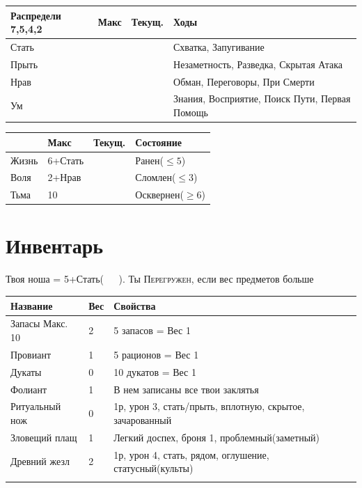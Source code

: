 \documentclass[10pt,twoside]{report}
\begin{document}
\begin{center}
\begin{tabular}{|p{2cm}|p{1cm}|p{1cm}|p{3cm}|}
\hline
  Распредели 7,5,4,2 & Макс & Текущ. & Ходы \\ \hline
  Стать & & & {\footnotesize Схватка, Запугивание}\\ [5ex] \hline
  Прыть & & & {\footnotesize Незаметность, Разведка, Скрытая Атака}\\ \hline
  Нрав & & & {\footnotesize Обман, Переговоры, При Смерти}\\ [5ex] \hline
  Ум & & & {\footnotesize Знания, Восприятие, Поиск Пути, Первая Помощь} \\ \hline
\end{tabular}

\begin{tabular}{|p{1.5cm}|p{1.5cm}|p{1cm}|p{3cm}|}
  \hline
   & Макс & Текущ. & Состояние \\ \hline
  Жизнь & 6+Стать & & Ранен($\leq 5$) \\ \hline
  Воля & 2+Нрав & & Сломлен($\leq 3$) \\ \hline
  Тьма & 10  & &  Осквернен($\geq 6$) \\ \hline
\end{tabular}

\end{center}

\pagebreak
\section*{Инвентарь}

Твоя ноша = 5+Стать(\verb!   !). Ты {\scshape Перегружен}, если вес
предметов больше
\begin{center}
  {\footnotesize
\begin{tabular}{|p{2cm}|p{0.5cm}|p{4.5cm}|}
  \hline
  Название & Вес & Свойства \\ \hline
  Запасы {\tiny Макс. 10} & 2 & 5 запасов = Вес 1 \\
  Провиант & 1 & 5 рационов = Вес 1 \\
  Дукаты & 0 & 10 дукатов = Вес 1 \\ \hline
  Фолиант & 1 & В нем записаны все твои заклятья \\
  Ритуальный нож & 0 & 1р, урон 3, стать/прыть, вплотную, скрытое, зачарованный \\
  Зловещий плащ & 1 & Легкий доспех, броня 1, проблемный(заметный) \\
  Древний жезл & 2 & 1р, урон 4, стать, рядом, оглушение, статусный(культы) \\
   & & \\ [45ex]
   \hline  
\end{tabular}
}
\end{center}
\pagebreak
\end{document}

